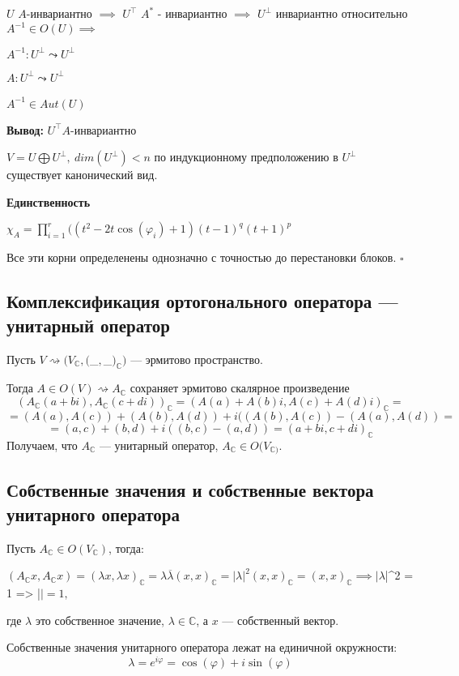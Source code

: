 \documentclass[12pt]{article}
\begin{document}
$U$ $A$-инвариантно $\implies$ $U^\top$  $A^*$ - инвариантно $\implies$ $U^\perp$ инвариантно относительно $A^{-1} \in O(U) \implies$

$A^{-1}: U^\perp \leadsto U^\perp$

$A : U^\perp \leadsto U^\perp $\

$A^{-1} \in Aut(U)$

\textbf{Вывод:} $U^\top A$-инвариантно

$V = U \bigoplus U^\perp, \ dim(U^\perp) <n$ по индукционному предположению в $U^\perp$ существует канонический вид.

\textbf{Единственность}

$\chi_A = \prod^r_{i = 1} ((t^2 - 2t\cos(\varphi_i) + 1)(t-1)^q(t+1)^p$

Все эти корни определенены однозначно с точностью до перестановки блоков. $\square$

\subsection{Комплексификация
 ортогонального оператора — унитарный оператор}
 
Пусть $V \rightsquigarrow (V_\mathbb{C}, ($_$,$_$)_\mathbb{C})$ — эрмитово пространство.

Тогда $A \in O(V) \rightsquigarrow A_\mathbb{C} $ сохраняет эрмитово скалярное произведение
\[
(A_\mathbb{C}(a+bi),A_\mathbb{C}(c+di))_\mathbb{C} = (A(a) + A(b)i, A(c) + A(d)i)_\mathbb{C} = 
\]
\[= (A(a), A(c)) + (A(b), A(d)) + i((A(b), A(c))-(A(a),A(d)) =
\]
\[
= (a,c) + (b,d) + i((b,c) - (a,d)) = (a+bi, c+di)_\mathbb{C}
\]
Получаем, что $A_\mathbb{C}$ — унитарный оператор, $A_\mathbb{C} \in O(V_\mathbb{C)}$.

\subsection{Собственные значения и собственные вектора
 унитарного оператора}
Пусть $A_\mathbb{C} \in O(V_\mathbb{C})$, тогда: 

$(A_\mathbb{C}x,A_\mathbb{C}x) = (\lambda x,\lambda x)_\mathbb{C}= \lambda \overline{\lambda}(x,x)_\mathbb{C}= |\lambda|^2(x,x)_\mathbb{C}= (x,x)_\mathbb{C} \implies |\lambda$|^2 = 1 => |\lambda$| = 1,$

где $\lambda$ это собственное значение, $\lambda \in \mathbb{C}$, а $x$ — собственный вектор.

Собственные значения унитарного оператора лежат на единичной окружности:
$$\lambda = e^{i\varphi} = \cos(\varphi) + i\sin(\varphi)$$
\end{document}
